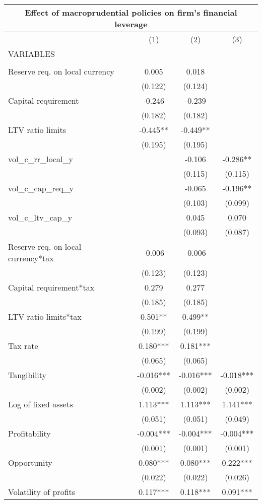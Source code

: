\begin{tabular}{lccc}
\multicolumn{4}{c}{Effect of macroprudential policies on firm's financial leverage} \\ \hline
 & (1) & (2) & (3) \\
VARIABLES &  &  &  \\ \hline
 &  &  &  \\
Reserve req. on local currency & 0.005 & 0.018 &  \\
 & (0.122) & (0.124) &  \\
Capital requirement & -0.246 & -0.239 &  \\
 & (0.182) & (0.182) &  \\
LTV ratio limits & -0.445** & -0.449** &  \\
 & (0.195) & (0.195) &  \\
vol\_c\_rr\_local\_y &  & -0.106 & -0.286** \\
 &  & (0.115) & (0.115) \\
vol\_c\_cap\_req\_y &  & -0.065 & -0.196** \\
 &  & (0.103) & (0.099) \\
vol\_c\_ltv\_cap\_y &  & 0.045 & 0.070 \\
 &  & (0.093) & (0.087) \\
Reserve req. on local currency*tax & -0.006 & -0.006 &  \\
 & (0.123) & (0.123) &  \\
Capital requirement*tax & 0.279 & 0.277 &  \\
 & (0.185) & (0.185) &  \\
LTV ratio limits*tax & 0.501** & 0.499** &  \\
 & (0.199) & (0.199) &  \\
Tax rate & 0.180*** & 0.181*** &  \\
 & (0.065) & (0.065) &  \\
Tangibility & -0.016*** & -0.016*** & -0.018*** \\
 & (0.002) & (0.002) & (0.002) \\
Log of fixed assets & 1.113*** & 1.113*** & 1.141*** \\
 & (0.051) & (0.051) & (0.049) \\
Profitability & -0.004*** & -0.004*** & -0.004*** \\
 & (0.001) & (0.001) & (0.001) \\
Opportunity & 0.080*** & 0.080*** & 0.222*** \\
 & (0.022) & (0.022) & (0.026) \\
Volatility of profits & 0.117*** & 0.118*** & 0.091*** \\

\end{tabular}
